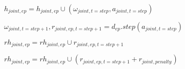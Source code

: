 \begin{algorithm}[hbt!]
{{{                $h_{joint,ep} = h_{joint,ep} \cup (\omega_{joint,t=step}, a_{joint,t=step})$


                $\omega_{joint,t=step+1}, r_{joint,ep,t=step+1} = d_{ep}.step(a_{joint,t=step})$

                $rh_{joint,ep} = rh_{joint,ep} \cup r_{joint,ep,t=step+1}$


                $rh_{joint,ep} = rh_{joint,ep} \cup (r_{joint,ep,t=step+1} + r_{joint, penalty})$

            }


        }

    }

\end{algorithm}